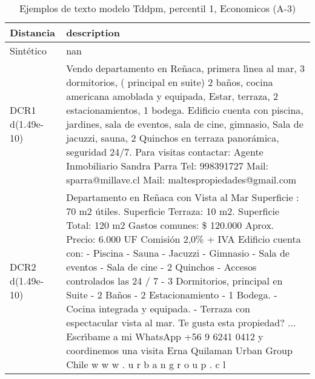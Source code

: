 \begin{table}[H]
\centering
\fontsize{10}{14}\selectfont
\caption{Ejemplos de texto modelo Tddpm, percentil 1, Economicos (A-3)}
\label{table-example-economicos-a-3-tddpm_mlp-1p-text}
\begin{tabular}{|l|m{35em}|}
\hline
\rowcolor[gray]{0.8}
Distancia & description \\
\hline Sintético & nan \\
\hline DCR1 d(1.49e-10) & Vendo departamento en Re\~naca, primera l{\'\i}nea al mar, 3 dormitorios, ( principal en suite) 2 ba\~nos, cocina americana amoblada y equipada, Estar, terraza, 2 estacionamientos, 1 bodega. Edificio cuenta con piscina, jardines, sala de eventos, sala de cine, gimnasio, Sala de jacuzzi, sauna, 2 Quinchos en terraza panor\'amica, seguridad 24/7.  Para visitas contactar: Agente Inmobiliario Sandra Parra Tel: 998391727 Mail: sparra@millave.cl Mail: maltespropiedades@gmail.com \\
\hline DCR2 d(1.49e-10) & Departamento en Re\~naca con Vista al Mar   Superficie : 70 m2 \'utiles. Superficie Terraza: 10 m2. Superficie Total: 120 m2  Gastos comunes: \$ 120.000 Aprox.  Precio: 6.000 UF  Comisi\'on 2,0\% + IVA  Edificio cuenta con: - Piscina  - Sauna - Jacuzzi - Gimnasio  - Sala de eventos  - Sala de cine  - 2 Quinchos  - Accesos controlados las 24 / 7  - 3 Dormitorios, principal en Suite - 2 Ba\~nos  - 2 Estacionamiento - 1 Bodega. - Cocina integrada y equipada.  - Terraza con espectacular vista al mar.  Te gusta esta propiedad? ... Escr{\'\i}bame a mi WhatsApp +56 9 6241 0412 y coordinemos una visita  Erna Quilaman Urban Group Chile w w w . u r b a n g r o u p . c l \\
\hline
\end{tabular}
\end{table}
